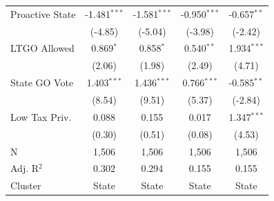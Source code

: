 \begin{tabular*}{\textwidth}{@{\extracolsep{\fill}}lcccc}
   Proactive State      & -1.481$^{***}$            & -1.581$^{***}$                & -0.950$^{***}$                       & -0.657$^{**}$\\   
                        & (-4.85)                  & (-5.04)                      & (-3.98)                             & (-2.42)\\   
   LTGO Allowed         & 0.869$^{*}$               & 0.858$^{*}$                   & 0.540$^{**}$                         & 1.934$^{***}$\\   
                        & (2.06)                   & (1.98)                       & (2.49)                              & (4.71)\\   
   State GO Vote        & 1.403$^{***}$             & 1.436$^{***}$                 & 0.766$^{***}$                        & -0.585$^{**}$\\   
                        & (8.54)                   & (9.51)                       & (5.37)                              & (-2.84)\\   
   Low Tax Priv.        & 0.088                     & 0.155                         & 0.017                                & 1.347$^{***}$\\   
                        & (0.30)                   & (0.51)                       & (0.08)                              & (4.53)\\   
   \hline
   N         & 1,506                     & 1,506                         & 1,506                                & 1,506\\  
   Adj. R$^2$       & 0.302                     & 0.294                         & 0.155                                & 0.155\\  
   Cluster              & State & State & State & State\\  
   \bottomrule
\end{tabular*}
\par\endgroup
